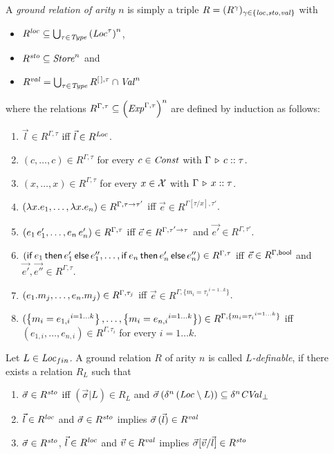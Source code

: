 \documentclass[12pt,a4paper]{report}
\begin{document}
\begin{definition}
  A {\em ground relation of arity $n$} is simply a triple $R = (R^\gamma)_{\gamma\in\{\mathit{loc},\mathit{sto},\mathit{val}\}}$ with
  \begin{itemize}
    \item $R^{\mathit{loc}} \subseteq \bigcup_{\tau\in\mathit{Type}} \left(\mathit{Loc}^\tau\right)^n$,
    \item $R^{\mathit{sto}} \subseteq \mathit{Store}^n$ and
    \item $R^{\mathit{val}} = \bigcup_{\tau\in\mathit{Type}} R^{[\,],\tau} \cap \mathit{Val}^n$
  \end{itemize}
  where the relations $R^{\Gamma,\tau} \subseteq \left(\mathit{Exp}^{\Gamma,\tau}\right)^n$ are defined by induction as follows:
  \begin{enumerate}
    \item $\vec{l}\in R^{\Gamma,\tau}$ iff $\vec{l}\in R^{\mathit{Loc}}$.
    \item $(c,\ldots,c)\in R^{\Gamma,\tau}$ for every $c\in\mathit{Const}$ with $\Gamma\,\triangleright\,c\mathrel{::}\tau$.
    \item $(x,\ldots,x)\in R^{\Gamma,\tau}$ for every $x\in\mathcal{X}$ with $\Gamma\,\triangleright\,x\mathrel{::}\tau$.
    \item $(\lambda x.e_1,\ldots,\lambda x.e_n)\in R^{\Gamma,\tau\to\tau'}$ iff
          $\vec{e}\in R^{\Gamma[\tau/x],\tau'}$.
    \item $(e_1\,e_1',\ldots,e_n\,e_n')\in R^{\Gamma,\tau}$ iff
          $\vec{e}\in R^{\Gamma,\tau'\to\tau}$ and
          $\vec{e'}\in R^{\Gamma,\tau'}$.
    \item $(\mathsf{if}\,e_1\,\mathsf{then}\,e_1'\,\mathsf{else}\,e_1'',\ldots,\mathsf{if}\,e_n\,\mathsf{then}\,e_n'\,\mathsf{else}\,e_n'')\in R^{\Gamma,\tau}$ iff
          $\vec{e}\in R^{\Gamma,\mathsf{bool}}$ and $\vec{e'},\vec{e''}\in R^{\Gamma,\tau}$.
    \item $(e_1.m_j,\ldots,e_n.m_j)\in R^{\Gamma,\tau_j}$ iff
          $\vec{e}\in R^{\Gamma,\{{m_i=\tau_i}^{i=1 \ldots k}\}}$.
    \item $(\left\{{m_i=e_{1,i}}^{i=1 \ldots k}\right\},\ldots,\left\{{m_i=e_{n,i}}^{i=1 \ldots k}\right\})\in
            R^{\Gamma,\{{m_i=\tau_i}^{i=1 \ldots k}\}}$ iff \\
            $(e_{1,i},\ldots,e_{n,i})\in R^{\Gamma,\tau_i}$ for every $i=1 \ldots k$.
  \end{enumerate}
\end{definition}

\begin{definition}[$L$-definability]
  Let $L \in \mathit{Loc}_{fin}$. A ground relation $R$ of arity $n$ is called {\em $L$-definable}, if there
  exists a relation $R_L$ such that
  \begin{enumerate}
    \item $\vec{\sigma}\in R^{\mathit{sto}}$ iff $(\vec{\sigma}|L) \in R_L$ and
          $\vec{\sigma}\,(\delta^n\,(\mathit{Loc} \setminus L)) \subseteq \delta^n \mathit{CVal}_\bot$
    \item $\vec{l}\in R^{\mathit{loc}}$ and $\vec{\sigma}\in R^{\mathit{sto}}$ implies $\vec{\sigma}\,(\vec{l})\in R^{\mathit{val}}$
    \item $\vec{\sigma}\in R^{\mathit{sto}}$, $\vec{l}\in R^{\mathit{loc}}$ and $\vec{v}\in R^{\mathit{val}}$ implies
          $\vec{\sigma}[\vec{v}/\vec{l}]\in R^{\mathit{sto}}$
  \end{enumerate}
\end{definition}
\end{document}
